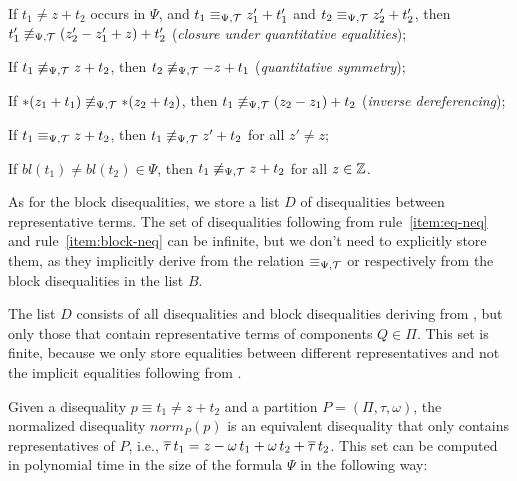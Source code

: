 \begin{enumerate}[label={[D\arabic*]}, ref={[D\arabic*]}]
    \setcounter{enumi}{-1} %
    \item\label{item:neq-quantitative-equalities}
    If $t_1 \neq z + t_2$ occurs in $\Psi$, and $t_1 \equiv_{\Psi,\mathcal{T}} z'_1 + t'_1$ and $t_2\equiv_{\Psi,\mathcal{T}} z'_2+t'_2$,
    then $t'_1\not\equiv_{\Psi,\mathcal{T}} (z'_2-z'_1+z)+t'_2$ (\emph{closure under quantitative equalities});
    \item\label{item:neq-quantitative-symmetry} If $t_1 \not\equiv_{\Psi,\mathcal{T}} z + t_2$, then $t_2 \not\equiv_{\Psi,\mathcal{T}} -z + t_1$ (\emph{quantitative symmetry});
          \item\label{item:inverse-deref}
          If $*(z_1 + t_1) \not\equiv_{\Psi,\mathcal{T}} *(z_2 + t_2)$, then $t_1 \not\equiv_{\Psi,\mathcal{T}} (z_2 - z_1) + t_2$
          (\emph{inverse dereferencing});
          \item\label{item:eq-neq} If $t_1 \equiv_{\Psi,\mathcal{T}} z + t_2$, then $t_1\not\equiv_{\Psi,\mathcal{T}} z'+t_2$ for all $z'\neq z$;
          \item\label{item:block-neq} If $bl(t_1) \neq bl(t_2) \in \Psi$, then $t_1 \not\equiv_{\Psi,\mathcal{T}} z + t_2$ for all $z \in \mathbb{Z}$.
\end{enumerate}

As for the block disequalities, we store a list $D$ of disequalities between representative terms.
The set of disequalities following from rule~\ref{item:eq-neq} and rule~\ref{item:block-neq} can be infinite, but we don't need to explicitly store them, as they implicitly derive from the relation $\equiv_{\Psi,\mathcal{T}}$ or respectively from the block disequalities in the list $B$.

The list $D$ consists of all disequalities and block disequalities deriving from
,
but only those that contain representative terms of components $Q\in\Pi$.
This set is finite, because we only store equalities between different representatives and not the implicit equalities following from .

Given a disequality $p \equiv t_1 \neq z + t_2$ and a partition $P = (\Pi, \tau, \omega)$,
the normalized disequality $norm_P(p)$ is an equivalent disequality that only contains representatives of $P$,
i.e., $\overline{\tau}\,t_1 = z - \omega\,t_1 + \omega\,t_2 + \overline{\tau}\,t_2$.
This set can be computed in polynomial time in the size of the formula $\Psi$ in the following way:

